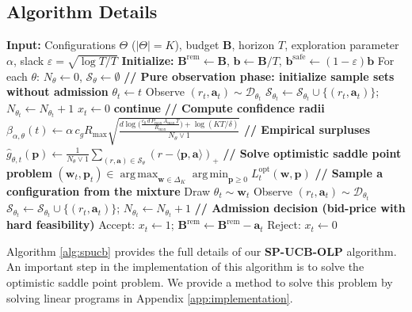 \documentclass[11pt]{article}
\newcommand{\bB}{\mathbf{B}}
\newcommand{\bb}{\mathbf{b}}
\newcommand{\bbS}{\mathbf{b}^{\mathrm{safe}}}
\newcommand{\ba}{\mathbf{a}}
\newcommand{\bp}{\mathbf{p}}
\newcommand{\bw}{\mathbf{w}}
\newcommand{\cD}{\mathcal{D}}
\newcommand{\cS}{\mathcal{S}}
\DeclareMathOperator*{\argmax}{arg\,max}
\DeclareMathOperator*{\argmin}{arg\,min}
\begin{document}
\subsection{Algorithm Details}
\begin{algorithm}[ht!]
\caption{SP-UCB--OLP:}
\label{alg:spucb}
\begin{algorithmic}[1]
\STATE \textbf{Input:} Configurations $\Theta$ ($|\Theta| = K$), budget $\bB$, horizon $T$, exploration parameter $\alpha$, slack $\varepsilon = \sqrt{\log T / T}$
\STATE \textbf{Initialize:} $\bB^{\mathrm{rem}} \gets \bB$, $\bb \gets \bB/T$, $\bbS \gets (1-\varepsilon)\bb$
\STATE For each $\theta$: $N_\theta \gets 0$, $\cS_\theta \gets \emptyset$
    \STATE \textbf{// Pure observation phase: initialize sample sets without admission}
        \STATE $\theta_t \gets t$ 
        \STATE Observe $(r_t, \ba_t) \sim \cD_{\theta_t}$
        \STATE $\cS_{\theta_t} \gets \cS_{\theta_t} \cup \{(r_t, \ba_t)\}$; \quad $N_{\theta_t} \gets N_{\theta_t} + 1$
        \STATE $x_t \gets 0$ 
        \STATE \textbf{continue}
    \ENDIF
    \STATE \textbf{// Compute confidence radii}
        \STATE $\beta_{\alpha,\theta}(t) \gets \alpha\, c_g R_{\max} \sqrt{\frac{d \log\!\Big(\frac{c_0\,d\,P_{\max}\,A_{\max}\,T}{R_{\max}}\Big) + \log(KT/\delta)}{N_\theta \vee 1}}$
    \ENDFOR
    \STATE \textbf{// Empirical surpluses}
    \STATE $\widehat{g}_{\theta,t}(\bp) \gets \frac{1}{N_\theta \vee 1} \sum_{(r,\ba) \in \cS_\theta} (r - \langle \bp, \ba \rangle)_+$
    \STATE \textbf{// Solve optimistic saddle point problem}
    \STATE $(\bw_t, \bp_t) \in \argmax_{\bw \in \Delta_K} \argmin_{\bp \geq 0} L_t^{\mathrm{opt}}(\bw, \bp)$ \hfill {}
    \STATE \textbf{// Sample a configuration from the mixture}
    \STATE Draw $\theta_t \sim \bw_t$
    \STATE Observe $(r_t, \ba_t) \sim \cD_{\theta_t}$
    \STATE $\cS_{\theta_t} \gets \cS_{\theta_t} \cup \{(r_t, \ba_t)\}$; \quad $N_{\theta_t} \gets N_{\theta_t} + 1$
    \STATE \textbf{// Admission decision (bid-price with hard feasibility)}
    \IF{$\ba_t \le \bB^{\mathrm{rem}}$ \AND $r_t > \langle \bp_t, \ba_t \rangle$}
        \STATE Accept: $x_t \gets 1$; \quad $\bB^{\mathrm{rem}} \gets \bB^{\mathrm{rem}} - \ba_t$
    \ELSE
        \STATE Reject: $x_t \gets 0$
    \ENDIF
\ENDFOR
\end{algorithmic}
\end{algorithm}
Algorithm \ref{alg:spucb} provides the full details of our \textbf{SP-UCB-OLP} algorithm. An important step in the implementation of this algorithm is to solve the optimistic saddle point problem. We provide a method to solve this problem by solving linear programs in Appendix \ref{app:implementation}.
\end{document}
